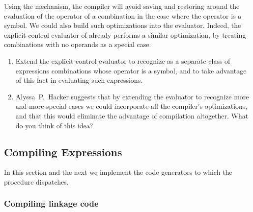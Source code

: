 \begin{exercise}
	\label{Exercise 5.32}
	Using the  mechanism, the compiler will avoid saving and restoring  around the evaluation of the operator of a combination in the case where the operator is a symbol.
	We could also build such optimizations into the evaluator.
	Indeed, the explicit-control evaluator of  already performs a similar optimization, by treating combinations with no operands as a special case.
	\begin{enumerate}[label = \alph*., leftmargin = *]

		\item
			Extend the explicit-control evaluator to recognize as a separate class of expressions combinations whose operator is a symbol, and to take advantage of this fact in evaluating such expressions.

		\item
			Alyssa P. Hacker suggests that by extending the evaluator to recognize more and more special cases we could incorporate all the compiler’s optimizations, and that this would eliminate the advantage of compilation altogether.
			What do you think of this idea?

	\end{enumerate}
\end{exercise}



\subsection{Compiling Expressions}
\label{Section 5.5.2}

In this section and the next we implement the code generators to which the  procedure dispatches.



\subsubsection*{Compiling linkage code}

